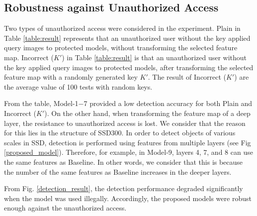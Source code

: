 \documentclass[conference,10pt,a4paper]{IEEEtran}
\begin{document}
\subsection{Robustness against Unauthorized Access}
Two types of unauthorized access were considered in the experiment.
Plain in Table \ref{table:result} represents that an unauthorized user without the key applied query images to protected models, without transforming the selected feature map. Incorrect ($K'$) in Table \ref{table:result} is that an unauthorized user without the key applied query images to protected models, after transforming the selected feature map with a randomly generated key $K'$. 
The result of Incorrect ($K'$) are the average value of 100 tests with random keys. \par 
From the table, Model-1$-$7 provided a low detection accuracy for both Plain and Incorrect ($K'$). On the other hand, when transforming the feature map of a deep layer, the resistance to unauthorized access is lost.
We consider that the reason for this lies in the structure of SSD300.
In order to detect objects of various scales in SSD, detection is performed using features from multiple layers (see Fig \ref{proposed_model}). Therefore, for example, in Model-9, layers 4, 7, and 8 can use the same features as Baseline. In other words, we consider that this is because the number of the same features as Baseline increases in the deeper layers.\par
From Fig. \ref{detection_result}, the detection performance degraded significantly when the model was used illegally. Accordingly, the proposed models were robust enough against the unauthorized access.
\begin{table}[tb]
 \caption{Detection accuracy (mAP) of models \\ with encrypted input images}
 \label{table:SHF}
 \centering
\end{table}
\end{document}
